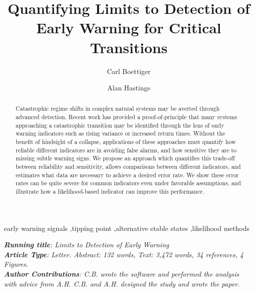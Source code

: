 \documentclass[authoryear,preprint,11pt]{elsarticle}
\begin{document}
\begin{frontmatter}
  \title{Quantifying Limits to Detection of Early Warning for Critical Transitions}
  \author[cpb]{Carl Boettiger}
  \author[esp]{Alan Hastings}
  \address[cpb]{Center for Population Biology, 1 Shields Avenue, University of California, Davis, CA, 95616 United States.}
  \address[esp]{Department of Environmental Science and Policy, University of California, Davis} 


  \begin{abstract}

Catastrophic regime shifts in complex natural systems may be averted through advanced detection. 
Recent work has provided a proof-of-principle that many systems approaching a catastrophic transition may be identified 
through the lens of early warning indicators such as rising variance or increased return times.  
Without the benefit of hindsight of a collapse, 
applications of these approaches must quantify how reliable different indicators are in avoiding false alarms, 
and how sensitive they are to missing subtle warning signs.  
We propose an approach which quantifies this trade-off between reliability and sensitivity, 
allows comparisons between different indicators, 
and estimates what data are necessary to achieve a desired error rate. 
We show these error rates can be quite severe for common indicators even under favorable assumptions, 
and illustrate how a likelihood-based indicator can improve this performance.  

  \end{abstract}

  \begin{keyword}
early warning signals \sep tipping point \sep alternative stable states \sep likelihood methods 
   \end{keyword}
 \end{frontmatter}
\emph{\noindent \textbf{Running title}: Limits to Detection of Early Warning \\ 
  \textbf{Article Type}: Letter.  Abstract: 132 words, Text: 3,472 words, 34 references, 4 Figures. \\
  \textbf{Author Contributions}: C.B. wrote the software and performed the analysis with advice from A.H.  C.B. and A.H. designed the study and wrote the paper. 
}
\end{document}
